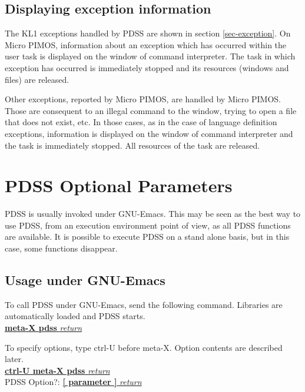 \subsection{Displaying exception information}
\label{sec-MPIMOS-exception}

The KL1 exceptions handled by PDSS are shown in section \ref{sec-exception}.
On Micro PIMOS, information about an exception which has occurred within
the user task is displayed
on the window of command interpreter. The task in which exception has
occurred is immediately stopped and its resources (windows and files)
are released.

Other exceptions, reported by Micro PIMOS, are handled by Micro PIMOS.
Those are consequent to an illegal command to the window, trying to 
open a file that does not exist, etc. In those cases,
as in the case of language definition exceptions,
information is displayed on the window of 
command interpreter and the task is immediately stopped.
All resources of the task are released.

\newpage
\section{PDSS Optional Parameters}

PDSS is usually invoked under GNU-Emacs. This may be seen as the best way
to use PDSS, from an
execution environment point of view, as all PDSS functions are available.
It is possible to execute PDSS on a stand alone basis, but in this case,
some functions disappear.

\subsection{Usage under GNU-Emacs}

To call PDSS under GNU-Emacs, send the following command. Libraries are
automatically loaded and PDSS starts.
\vspace{2ex}\\
\hspace*{10em}\underline{{\bf meta-X pdss} {\it return}}
\vspace{2ex}

To specify options, type ctrl-U before meta-X. Option contents are described
later.
\vspace{2ex}\\
\hspace*{10em}\underline{{\bf ctrl-U meta-X pdss} {\it return}}\\
\hspace*{10em} PDSS Option?: \underline{{\bf [ parameter ]} {\it return}}
\vspace{2ex}

